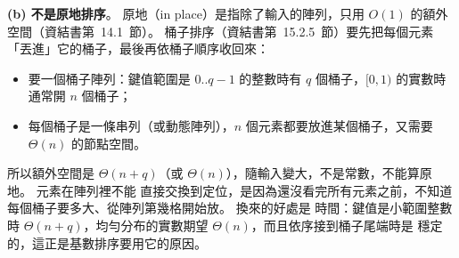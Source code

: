 \begin{pastsoln}
\textbf{(b) 不是原地排序}。 原地（in place）是指除了輸入的陣列，只用 $O(1)$ 的額外空間（資結書第~14.1~節）。
桶子排序（資結書第~15.2.5~節）要先把每個元素「丟進」它的桶子，最後再依桶子順序收回來：
\begin{itemize}
\item 要一個桶子陣列：鍵值範圍是 $0..q-1$ 的整數時有 $q$ 個桶子，$[0, 1)$ 的實數時通常開 $n$ 個桶子；
\item 每個桶子是一條串列（或動態陣列），$n$ 個元素都要放進某個桶子，又需要 $\Theta(n)$ 的節點空間。
\end{itemize}
所以額外空間是 $\Theta(n + q)$（或 $\Theta(n)$），隨輸入變大，不是常數，不能算原地。 元素在陣列裡不能
直接交換到定位，是因為還沒看完所有元素之前，不知道每個桶子要多大、從陣列第幾格開始放。 換來的好處是
時間：鍵值是小範圍整數時 $\Theta(n + q)$，均勻分布的實數期望 $\Theta(n)$，而且依序接到桶子尾端時是
穩定的，這正是基數排序要用它的原因。
\end{pastsoln}
